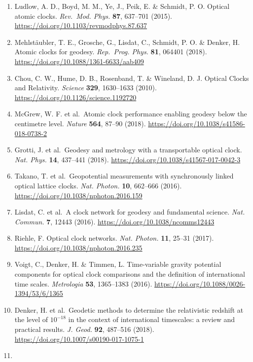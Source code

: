 \documentclass[
  12pt,
  a4paper,
]{article}
\providecommand{\tightlist}{%
  \setlength{\itemsep}{0pt}\setlength{\parskip}{0pt}}
\begin{document}
\begin{enumerate}
\def\labelenumi{\arabic{enumi}.}
\tightlist
\item
  Ludlow, A. D., Boyd, M. M., Ye, J., Peik, E. \& Schmidt, P. O. Optical
  atomic clocks. \emph{Rev.~Mod. Phys.} \textbf{87}, 637--701 (2015).
  \url{https://doi.org/10.1103/revmodphys.87.637}
\item
  Mehlstäubler, T. E., Grosche, G., Lisdat, C., Schmidt, P. O. \&
  Denker, H. Atomic clocks for geodesy. \emph{Rep.~Prog. Phys.}
  \textbf{81}, 064401 (2018).
  \url{https://doi.org/10.1088/1361-6633/aab409}
\item
  Chou, C. W., Hume, D. B., Rosenband, T. \& Wineland, D. J. Optical
  Clocks and Relativity. \emph{Science} \textbf{329}, 1630--1633 (2010).
  \url{https://doi.org/10.1126/science.1192720}
\item
  McGrew, W. F. et al.~Atomic clock performance enabling geodesy below
  the centimetre level. \emph{Nature} \textbf{564}, 87--90 (2018).
  \url{https://doi.org/10.1038/s41586-018-0738-2}
\item
  Grotti, J. et al.~Geodesy and metrology with a transportable optical
  clock. \emph{Nat. Phys.} \textbf{14}, 437--441 (2018).
  \url{https://doi.org/10.1038/s41567-017-0042-3}
\item
  Takano, T. et al.~Geopotential measurements with synchronously linked
  optical lattice clocks. \emph{Nat. Photon.} \textbf{10}, 662--666
  (2016). \url{https://doi.org/10.1038/nphoton.2016.159}
\item
  Lisdat, C. et al.~A clock network for geodesy and fundamental science.
  \emph{Nat. Commun.} \textbf{7}, 12443 (2016).
  \url{https://doi.org/10.1038/ncomms12443}
\item
  Riehle, F. Optical clock networks. \emph{Nat. Photon.} \textbf{11},
  25--31 (2017). \url{https://doi.org/10.1038/nphoton.2016.235}
\item
  Voigt, C., Denker, H. \& Timmen, L. Time-variable gravity potential
  components for optical clock comparisons and the definition of
  international time scales. \emph{Metrologia} \textbf{53}, 1365--1383
  (2016). \url{https://doi.org/10.1088/0026-1394/53/6/1365}
\item
  Denker, H. et al.~Geodetic methods to determine the relativistic
  redshift at the level of \(10^{-18}\) in the context of international
  timescales: a review and practical results. \emph{J. Geod.}
  \textbf{92}, 487--516 (2018).
  \url{https://doi.org/10.1007/s00190-017-1075-1}
\item

\end{enumerate}
\end{document}
